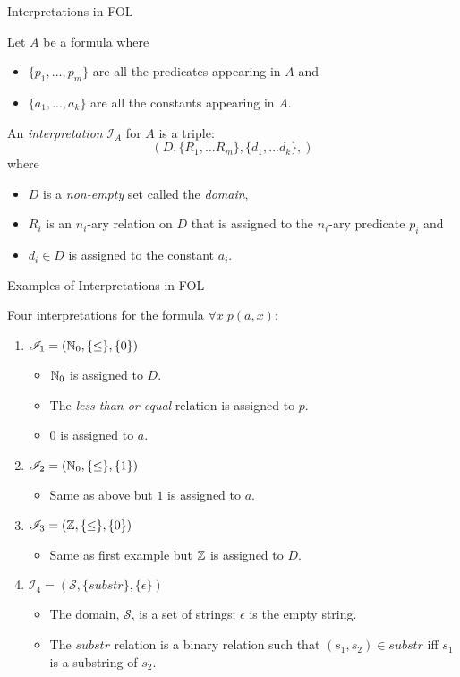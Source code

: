 \documentclass[style=sailor,size=12pt]{powerdot}
\begin{document}
\begin{wideslide}[bm=,toc=]{Interpretations in FOL}
\begin{defn}{7.16}
Let $A$ be a formula where 
\begin{itemize}
\item<2-> $\{p_1,...,p_m\}$ are all the predicates appearing in $A$ and 
\item<3-> $\{a_1,...,a_k\}$ are all the constants appearing in $A$.
\end{itemize}
\pause[3]
An \emph{interpretation} $\mathcal{I}_A$ for $A$ is a triple:
\pause
\[(D,\{R_1,...R_m\}, \{d_1,...d_k\},)\]
\pause
where 
\begin{itemize}
\item<6-> $D$ is a \emph{non-empty} set called the \emph{domain}, 
\item<7-> $R_i$ is an $n_i$-ary relation on $D$ that is assigned to the $n_i$-ary predicate
$p_i$ and 
\item<8-> $d_i \in D$ is assigned to the constant $a_i$.
\end{itemize}
\end{defn}
\end{wideslide}
\begin{wideslide}[bm=,toc=]{Examples of Interpretations in FOL}
\begin{ex}{7.17}
Four interpretations for the formula $\forall x \; p(a,x)$:
\end{ex}
\vspace*{-2ex}
\begin{enumerate}
\item<2-> $\mathcal{I}_1 = (\mathbb{N}_0,\{\leq\},\{0\})$
\begin{itemize}
\item<3-> $\mathbb{N}_0$ is assigned to $D$.
\item<3-> The \emph{less-than or equal} relation is assigned to $p$.
\item<3-> $0$ is assigned to $a$.
\end{itemize}
\item<4-> $\mathcal{I}_2 = (\mathbb{N}_0,\{\leq\},\{1\})$
\begin{itemize}
\item<5-> Same as above but $1$ is assigned to $a$. 
\end{itemize}
\item<6-> $\mathcal{I}_3 = (\mathbb{Z},\{\leq\},\{0\})$
\begin{itemize}
\item<7-> Same as first example but $\mathbb{Z}$ is assigned to $D$. 
\end{itemize}
\item<8-> $\mathcal{I}_4 = (\mathcal{S},\{substr\},\{ \epsilon \})$
\begin{itemize}
\item The domain, $\mathcal{S}$, is a set of strings; $\epsilon$ is the empty string.
\item The $substr$ relation is a binary relation such that $(s_1,s_2) \in substr$
iff $s_1$ is a substring of $s_2$.
\end{itemize}

\end{enumerate}
\end{wideslide}
\end{document}
